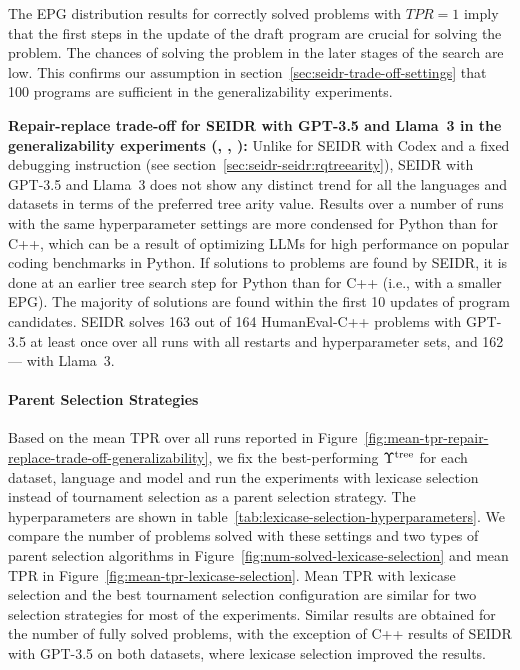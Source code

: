 The EPG distribution results for correctly solved problems with $TPR=1$ imply that the first steps in the update of the draft program are crucial for solving the problem. 
The chances of solving the problem in the later stages of the search are low.
This confirms our assumption in section~\ref{sec:seidr-trade-off-settings} that 100 programs are sufficient in the generalizability experiments.

\begin{highlight}
\textbf{Repair-replace trade-off for SEIDR with GPT-3.5 and Llama~3 in the generalizability experiments (\rqtreearity{}, \rqllama{}, \rqmultirun{}):}
Unlike for SEIDR with Codex and a fixed debugging instruction (see section~\ref{sec:seidr-seidr:rqtreearity}), SEIDR with GPT-3.5 and Llama~3 does not show any distinct trend for all the languages and datasets in terms of the preferred tree arity value. 
Results over a number of runs with the same hyperparameter settings are more condensed for Python than for C++, which can be a result of optimizing LLMs for high performance on popular coding benchmarks in Python.
If solutions to problems are found by SEIDR, it is done at an earlier tree search step for Python than for C++ (i.e., with a smaller EPG). 
The majority of solutions are found within the first 10 updates of program candidates. 
SEIDR solves 163 out of 164 HumanEval-C++ problems with GPT-3.5 at least once over all runs with all restarts and hyperparameter sets, and 162 --- with Llama~3.
\end{highlight}



\paragraph{Parent Selection Strategies}
\label{sec:seidr-lexicase-results}

Based on the mean TPR over all runs reported in Figure~\ref{fig:mean-tpr-repair-replace-trade-off-generalizability}, we fix the best-performing $\Upsilon^\text{tree}$ for each dataset, language and model and run the experiments with lexicase selection instead of tournament selection as a parent selection strategy. 
The hyperparameters are shown in table~\ref{tab:lexicase-selection-hyperparameters}.
We compare the number of problems solved with these settings and two types of parent selection algorithms in Figure~\ref{fig:num-solved-lexicase-selection} and mean TPR in Figure~\ref{fig:mean-tpr-lexicase-selection}.
Mean TPR with lexicase selection and the best tournament selection configuration are similar for two selection strategies for most of the experiments.
Similar results are obtained for the number of fully solved problems, with the exception of C++ results of SEIDR with GPT-3.5 on both datasets, where lexicase selection improved the results.

